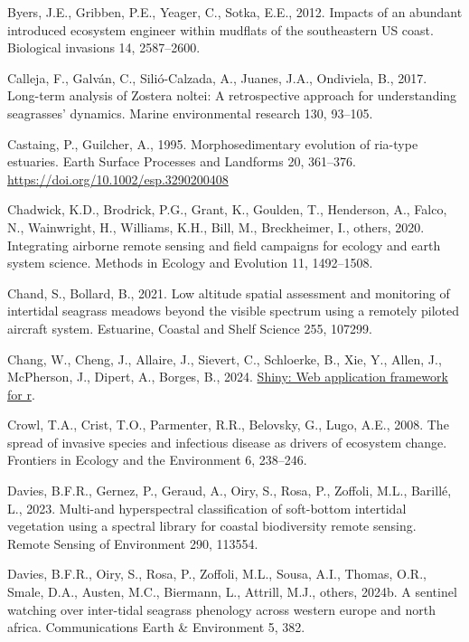 \documentclass[
  letterpaper,
  DIV=11,
  numbers=noendperiod]{scrartcl}
\newlength{\cslhangindent}
\newenvironment{CSLReferences}[2] %
 {\begin{list}{}{%
  \setlength{\itemindent}{0pt}
  \setlength{\leftmargin}{0pt}
  \setlength{\parsep}{0pt}
  \ifodd #1
   \setlength{\leftmargin}{\cslhangindent}
   \setlength{\itemindent}{-1\cslhangindent}
  \fi
  \setlength{\itemsep}{#2\baselineskip}}}
 {\end{list}}
\begin{document}
\begin{CSLReferences}{1}{0}
Byers, J.E., Gribben, P.E., Yeager, C., Sotka, E.E., 2012. Impacts of an
abundant introduced ecosystem engineer within mudflats of the
southeastern US coast. Biological invasions 14, 2587--2600.

Calleja, F., Galván, C., Silió-Calzada, A., Juanes, J.A., Ondiviela, B.,
2017. Long-term analysis of {Z}ostera noltei: A retrospective approach
for understanding seagrasses' dynamics. Marine environmental research
130, 93--105.

Castaing, P., Guilcher, A., 1995. Morphosedimentary evolution of
ria-type estuaries. Earth Surface Processes and Landforms 20, 361--376.
\url{https://doi.org/10.1002/esp.3290200408}

Chadwick, K.D., Brodrick, P.G., Grant, K., Goulden, T., Henderson, A.,
Falco, N., Wainwright, H., Williams, K.H., Bill, M., Breckheimer, I.,
others, 2020. Integrating airborne remote sensing and field campaigns
for ecology and earth system science. Methods in Ecology and Evolution
11, 1492--1508.

Chand, S., Bollard, B., 2021. Low altitude spatial assessment and
monitoring of intertidal seagrass meadows beyond the visible spectrum
using a remotely piloted aircraft system. Estuarine, Coastal and Shelf
Science 255, 107299.

Chang, W., Cheng, J., Allaire, J., Sievert, C., Schloerke, B., Xie, Y.,
Allen, J., McPherson, J., Dipert, A., Borges, B., 2024.
\href{https://CRAN.R-project.org/package=shiny}{Shiny: Web application
framework for r}.

Crowl, T.A., Crist, T.O., Parmenter, R.R., Belovsky, G., Lugo, A.E.,
2008. The spread of invasive species and infectious disease as drivers
of ecosystem change. Frontiers in Ecology and the Environment 6,
238--246.

Davies, B.F.R., Gernez, P., Geraud, A., Oiry, S., Rosa, P., Zoffoli,
M.L., Barillé, L., 2023. Multi-and hyperspectral classification of
soft-bottom intertidal vegetation using a spectral library for coastal
biodiversity remote sensing. Remote Sensing of Environment 290, 113554.

Davies, B.F.R., Oiry, S., Rosa, P., Zoffoli, M.L., Sousa, A.I., Thomas,
O.R., Smale, D.A., Austen, M.C., Biermann, L., Attrill, M.J., others,
2024b. A sentinel watching over inter-tidal seagrass phenology across
western europe and north africa. Communications Earth \& Environment 5,
382.


\end{CSLReferences}
\end{document}
